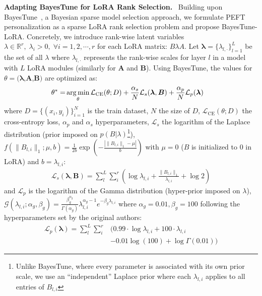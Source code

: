 \noindent\textbf{Adapting BayesTune for LoRA Rank Selection.}~
Building upon BayesTune~\cite{kim2023bayestune}, a Bayesian sparse model selection approach, we formulate PEFT personalization as a sparse LoRA rank selection problem and propose BayesTune-LoRA. 
Concretely, we introduce rank-wise latent variables $\lambda \in \mathbb{R}^r, \; \lambda_i > 0, \; \forall i=1,2,\cdots,r$ for each LoRA matrix: $B\lambda A$. Let $\bm{\lambda}= \{\lambda_{l,\cdot}\}_{l=1}^L$ be the set of all $\lambda$ where $\lambda_{l,\cdot}$ represents the rank-wise scales for layer $l$ in a model with $L$ LoRA modules (similarly for $\bm{A}$ and $\bm{B}$). Using BayesTune, the 
values for $\theta=(\bm{\lambda}$,$\bm{A}$,$\bm{B})$ are optimized as:
% 
\begin{align}
\label{eq:bayestune}
\theta^* =& \operatorname*{arg\,min}_{\theta} \mathcal{L}_{\text{CE}}(\theta;D) + \frac{\alpha_{s}}{N} \mathcal{L}_{s}(\bm{\lambda},\bm{B}) + \frac{\alpha_{p}}{N}\mathcal{L}_{p}(\bm{\lambda}) 
\end{align}
where $D$$=$$\{(x_i, y_i)\}_{i=1}^N$ is the train dataset, $N$ the size of $D$, $\mathcal{L}_{\text{CE}}(\theta;D)$ the cross-entropy loss, $\alpha_{p}$ and $\alpha_{s}$ hyperparameters, $\mathcal{L}_s$ the logarithm of the Laplace distribution (prior imposed on $p(B|\lambda)$\footnote{Unlike BayesTune, where every parameter is associated with its own prior scale, we use an ``independent'' Laplace prior where each $\lambda_{l,i}$ applies to all entries of $B_{l,i}$}), $f(\|B_{l,i}\|_1;\mu,b)= \frac{1}{2b} \exp\left(-\frac{|\|B_{l,i}\|_1 - \mu|}{b}\right)
$ with $\mu=0$ ($B$ is initialized to 0 in LoRA) and $b=\lambda_{l,i}$:
\begin{align}
\mathcal{L}_s(\bm{\lambda}, \bm{B}) = \sum^L_l \sum^r_i \left(\log \lambda_{l,i} + \frac{\|B_{l,i}\|_1}{\lambda_{l,i}} + \log2\right)
\end{align}
and $\mathcal{L}_p$ is the logarithm of the Gamma distribution (hyper-prior imposed on $\lambda$), $\mathcal{G}(\lambda_{l,i};\alpha_g,\beta_g)= \frac{\beta_g^{\alpha_g}}{\Gamma(\alpha_g)} \lambda_{l,i}^{\alpha_g-1} e^{-\beta_g \lambda_{l,i}}$ where $\alpha_g=0.01,\beta_g=100$ following the hyperparameters set by the original authors:
\begin{align}
\mathcal{L}_p(\bm{\lambda}) = \sum^L_l \sum^r_i &(0.99\cdot \log \lambda_{l,i} + 100 \cdot \lambda_{l,i} \nonumber \\
& - 0.01\log(100) + \log\Gamma(0.01)) 
\end{align}
